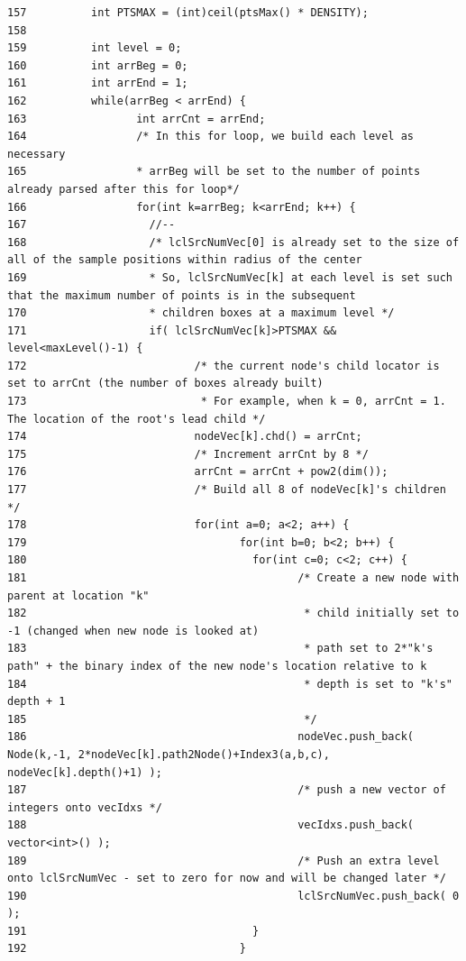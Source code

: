 \begin{verbatim}
157          int PTSMAX = (int)ceil(ptsMax() * DENSITY);
158          
159          int level = 0;
160          int arrBeg = 0;
161          int arrEnd = 1;
162          while(arrBeg < arrEnd) {
163                 int arrCnt = arrEnd;
164                 /* In this for loop, we build each level as necessary
165                 * arrBeg will be set to the number of points already parsed after this for loop*/
166                 for(int k=arrBeg; k<arrEnd; k++) {
167                   //--
168                   /* lclSrcNumVec[0] is already set to the size of all of the sample positions within radius of the center
169                   * So, lclSrcNumVec[k] at each level is set such that the maximum number of points is in the subsequent
170                   * children boxes at a maximum level */
171                   if( lclSrcNumVec[k]>PTSMAX && level<maxLevel()-1) {
172                          /* the current node's child locator is set to arrCnt (the number of boxes already built)
173                           * For example, when k = 0, arrCnt = 1.  The location of the root's lead child */
174                          nodeVec[k].chd() = arrCnt;
175                          /* Increment arrCnt by 8 */
176                          arrCnt = arrCnt + pow2(dim());
177                          /* Build all 8 of nodeVec[k]'s children */
178                          for(int a=0; a<2; a++) {
179                                 for(int b=0; b<2; b++) {
180                                   for(int c=0; c<2; c++) {
181                                          /* Create a new node with parent at location "k"
182                                           * child initially set to -1 (changed when new node is looked at)
183                                           * path set to 2*"k's path" + the binary index of the new node's location relative to k
184                                           * depth is set to "k's" depth + 1
185                                           */
186                                          nodeVec.push_back( Node(k,-1, 2*nodeVec[k].path2Node()+Index3(a,b,c), nodeVec[k].depth()+1) );
187                                          /* push a new vector of integers onto vecIdxs */
188                                          vecIdxs.push_back( vector<int>() );
189                                          /* Push an extra level onto lclSrcNumVec - set to zero for now and will be changed later */
190                                          lclSrcNumVec.push_back( 0 );
191                                   }
192                                 }

\end{verbatim}
